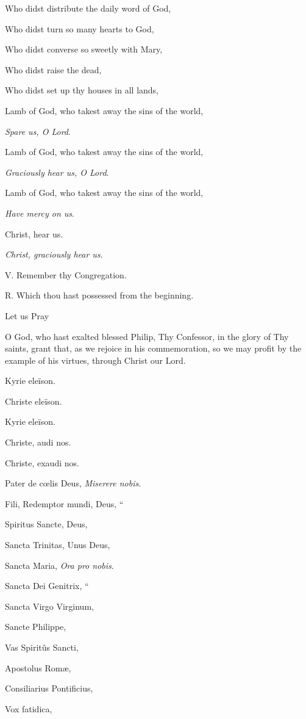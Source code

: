 Who didst distribute the daily word of God,

Who didst turn so many hearts to God,

Who didst converse so sweetly with Mary,

Who didst raise the dead,

Who didst set up thy houses in all lands,

Lamb of God, who takest away the sins of the world,

\emph{Spare us, O Lord}.

Lamb of God, who takest away the sins of the world,

\emph{Graciously hear us, O Lord}.

Lamb of God, who takest away the sins of the world,

\emph{Have mercy on us}.

Christ, hear us.

\emph{Christ, graciously hear us}.

V. Remember thy Congregation.

R. Which thou hast possessed from the beginning.

Let us Pray

O God, who hast exalted blessed Philip, Thy Confessor,
in the glory of Thy saints, grant that, as we rejoice in his
commemoration, so we may profit by the example of his virtues, through
Christ our Lord.


Kyrie eleïson.

Christe eleïson.

Kyrie eleïson.

Christe, audi nos.

Christe, exaudi nos.

Pater de cœlis Deus,
\emph{Miserere nobis}.

Fili, Redemptor mundi, Deus,
``

Spiritus Sancte, Deus,

Sancta Trinitas, Unus Deus,

Sancta Maria,
\emph{Ora pro nobis}.

Sancta Dei Genitrix,
``

Sancta Virgo Virginum,

Sancte Philippe,

Vas Spiritûs Sancti,

Apostolus Romæ,

Consiliarius Pontificius,

Vox fatidica,


